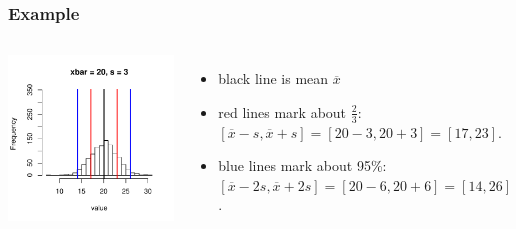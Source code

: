 \documentclass[handout]{beamer}
\begin{document}
\begin{frame}[fragile]
\frametitle{Example}

\begin{columns}
\begin{center}
\includegraphics[width=\textwidth]{figure/spread3.pdf}
\end{center}
\begin{itemize}
\item black line is mean $\overline{x}$
\item red lines mark about $\frac{2}{3}$:  $[\overline{x} - s, \overline{x} + s] = [20 - 3, 20 + 3] = [17, 23]$.  
\item blue lines mark about 95\%: $[\overline{x} - 2s, \overline{x} + 2s] = [20 - 6, 20 + 6] = [14, 26]$.
\end{itemize}
\end{columns}

\end{frame}
\end{document}
